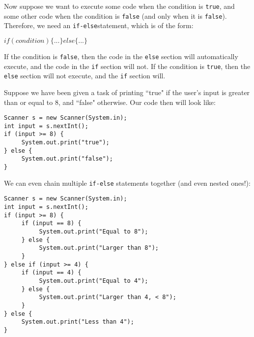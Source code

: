 \par Now suppose we want to execute some code when the condition is \verb|true|, and some other code when the condition is \verb|false| (and only when it is \verb|false|). Therefore, we need an \verb|if-else|statement, which is of the form:
\begin{center}
$if(condition) \{...\} else \{...\}$
\end{center}
If the condition is \verb|false|, then the code in the \verb|else| section will automatically execute, and the code in the \verb|if| section will not. If the condition is \verb|true|, then the \verb|else| section will not execute, and the \verb|if| section will.

\par Suppose we have been given a task of printing ``true" if the user's input is greater than or equal to 8, and ``false" otherwise. Our code then will look like:
\begin{lstlisting}
Scanner s = new Scanner(System.in);
int input = s.nextInt();
if (input >= 8) {
     System.out.print("true");
} else {
     System.out.print("false");
}
\end{lstlisting}
We can even chain multiple \verb|if-else| statements together (and even nested ones!):
\begin{lstlisting}
Scanner s = new Scanner(System.in);
int input = s.nextInt();
if (input >= 8) {
     if (input == 8) {
          System.out.print("Equal to 8");
     } else {
          System.out.print("Larger than 8");
     }
} else if (input >= 4) {
     if (input == 4) {
          System.out.print("Equal to 4");
     } else {
          System.out.print("Larger than 4, < 8");
     }
} else {
     System.out.print("Less than 4");
}
\end{lstlisting}

